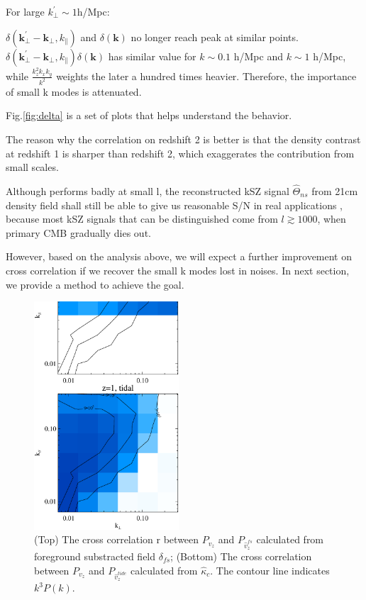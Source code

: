 For large $k_\perp^\prime\sim 1$h/Mpc:

$\delta(\bm{k_\perp^{\prime}}-\bm{k_\perp},k_\parallel)$ and $\delta(\bm{k})$ 
no longer reach peak at similar points.  
$\delta(\bm{k_\perp^{\prime}}-\bm{k_\perp},k_\parallel)\delta(\bm{k})$ 
has similar value for $k\sim 0.1$ h/Mpc and $k\sim 1$ h/Mpc, 
while $\frac{k_z^2k_xk_y}{k^2}$ weights the later a hundred times heavier.
Therefore, the importance of small k modes is attenuated.

Fig.\ref{fig:delta} is a set of plots that helps understand the behavior.

The reason why the correlation on redshift 2 is better is that 
the density contrast at redshift 1 is sharper than redshift 2, 
which exaggerates the contribution from small scales.

Although performs badly at small l, the reconstructed kSZ signal $\hat \Theta_{ns}$ 
from 21cm density field shall still be able to give us reasonable S/N in real applications  
, because most kSZ signals that can be distinguished come from $l\gtrsim 1000$, when primary CMB gradually dies out. 

However, based on the analysis above, 
we will expect a further improvement on cross correlation 
if we recover the small k modes lost in noises. 
In next section, we provide a method to achieve the goal.


\begin{figure}[tbp]
\begin{center}
\includegraphics[width=0.48\textwidth]{compare_powv2d_z1z2.eps}
\end{center}
\vspace{-0.7cm}
\caption{(Top) The cross correlation r between $P_{v_z}$ and 
    $P_{\hat v_z^{fs}}$ calculated from foreground substracted field $\delta_{fs}$; 
    (Bottom) The cross correlation between $P_{v_z}$ and $P_{\hat v_z^{tide}}$ calculated from $\hat \kappa_c$. 
The contour line indicates $k^3 P(k)$.
}
\label{fig:v}
\end{figure}
